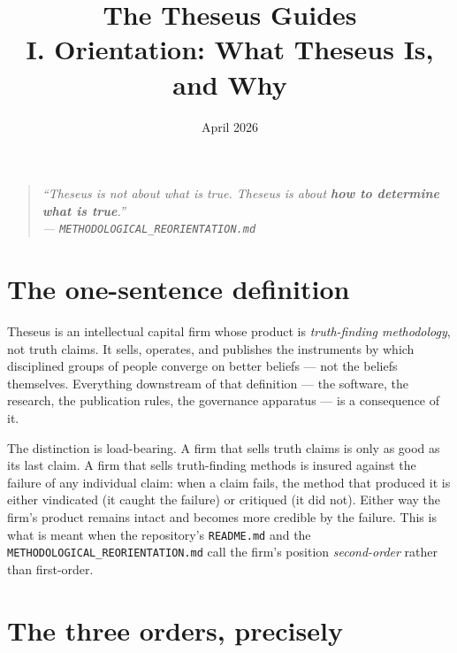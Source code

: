 \documentclass[11pt,letterpaper]{article}
\title{\textbf{The Theseus Guides}\\[6pt]\large I. Orientation: What Theseus Is, and Why}
\date{April 2026}
\author{}
\newcommand{\file}[1]{\texttt{#1}}
\begin{document}
\maketitle
\thispagestyle{empty}

\begin{quote}\itshape
``Theseus is not about what is true. Theseus is about \textbf{how to determine what is true}.'' \\ \hspace*{\fill}\normalfont --- \file{METHODOLOGICAL\_REORIENTATION.md}
\end{quote}

\vspace{1em}
\tableofcontents
\newpage

\section{The one-sentence definition}

Theseus is an intellectual capital firm whose product is \emph{truth-finding methodology}, not truth claims. It sells, operates, and publishes the instruments by which disciplined groups of people converge on better beliefs --- not the beliefs themselves. Everything downstream of that definition --- the software, the research, the publication rules, the governance apparatus --- is a consequence of it.

The distinction is load-bearing. A firm that sells truth claims is only as good as its last claim. A firm that sells truth-finding methods is insured against the failure of any individual claim: when a claim fails, the method that produced it is either vindicated (it caught the failure) or critiqued (it did not). Either way the firm's product remains intact and becomes more credible by the failure. This is what is meant when the repository's \file{README.md} and the \file{METHODOLOGICAL\_REORIENTATION.md} call the firm's position \emph{second-order} rather than first-order.

\section{The three orders, precisely}
\end{document}
